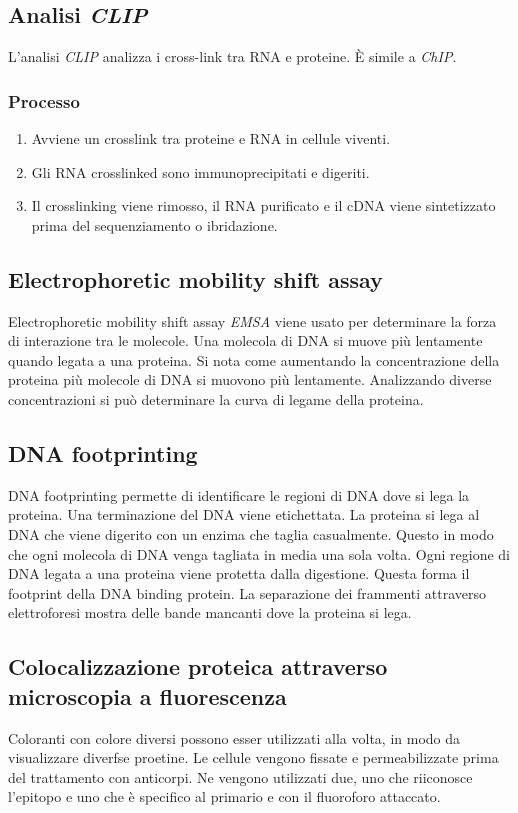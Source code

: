 	\subsection{Analisi \emph{CLIP}}
	L'analisi \emph{CLIP} analizza i cross-link tra RNA e proteine.
	\`E simile a \emph{ChIP}.

		\subsubsection{Processo}
		\begin{multicols}{2}
			\begin{enumerate}
				\item Avviene un crosslink tra proteine e RNA in cellule viventi.
				\item Gli RNA crosslinked sono immunoprecipitati e digeriti.
				\item Il crosslinking viene rimosso, il RNA purificato e il cDNA viene sintetizzato prima del sequenziamento o ibridazione.
			\end{enumerate}
		\end{multicols}

	\subsection{Electrophoretic mobility shift assay}
	Electrophoretic mobility shift assay \emph{EMSA} viene usato per determinare la forza di interazione tra le molecole.
	Una molecola di DNA si muove pi\`u lentamente quando legata a una proteina.
	Si nota come aumentando la concentrazione della proteina pi\`u molecole di DNA si muovono pi\`u lentamente.
	Analizzando diverse concentrazioni si pu\`o determinare la curva di legame della proteina.

	\subsection{DNA footprinting}
	DNA footprinting permette di identificare le regioni di DNA dove si lega la proteina.
	Una terminazione del DNA viene etichettata.
	La proteina si lega al DNA che viene digerito con un enzima che taglia casualmente.
	Questo in modo che ogni molecola di DNA venga tagliata in media una sola volta.
	Ogni regione di DNA legata a una proteina viene protetta dalla digestione.
	Questa forma il footprint della DNA binding protein.
	La separazione dei frammenti attraverso elettroforesi mostra delle bande mancanti dove la proteina si lega.

	\subsection{Colocalizzazione proteica attraverso microscopia a fluorescenza}
	Coloranti con colore diversi possono esser utilizzati alla volta, in modo da visualizzare diverfse proetine.
	Le cellule vengono fissate e permeabilizzate prima del trattamento con anticorpi.
	Ne vengono utilizzati due, uno che riiconosce l'epitopo e uno che \`e specifico al primario e con il fluoroforo attaccato.

